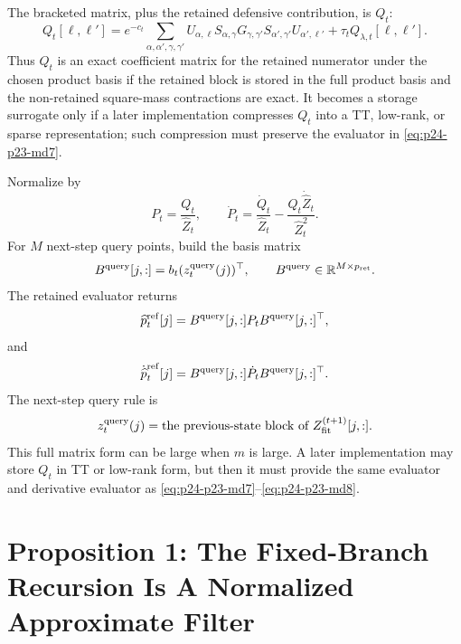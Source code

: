 \documentclass[11pt]{article}
\numberwithin{equation}{section}
\newcommand{\R}{\mathbb R}
\begin{document}
The bracketed matrix, plus the retained defensive contribution, is \(Q_t\):
\begin{equation}
    Q_t[\ell,\ell']
    =
    e^{-c_t}
    \sum_{\alpha,\alpha',\gamma,\gamma'}
    U_{\alpha,\ell}S_{\alpha,\gamma}
    G_{\gamma,\gamma'}
    S_{\alpha',\gamma'}U_{\alpha',\ell'}
    +
    \tau_t Q_{\lambda,t}[\ell,\ell'].
    \label{eq:p24-p23-md4e}
\end{equation}
Thus \(Q_t\) is an exact coefficient matrix for the retained numerator under
the chosen product basis if the retained block is stored in the full product
basis and the non-retained square-mass contractions are exact.  It becomes a
storage surrogate only if a later implementation compresses \(Q_t\) into a TT,
low-rank, or sparse representation; such compression must preserve the
evaluator in \eqref{eq:p24-p23-md7}.

Normalize by
\begin{equation}
    P_t=\frac{Q_t}{\widehat Z_t},
    \qquad
    \dot P_t=
    \frac{\dot Q_t}{\widehat Z_t}
    -
    \frac{Q_t\dot{\widehat Z}_t}{\widehat Z_t^2}.
    \label{eq:p24-p23-md5}
\end{equation}
For \(M\) next-step query points, build the basis matrix
\begin{equation}
    B^{\rm query}[j,:]=b_t(z_t^{\rm query}(j))^\top,
    \qquad
    B^{\rm query}\in\R^{M\times p_{\rm ret}}.
    \label{eq:p24-p23-md6}
\end{equation}
The retained evaluator returns
\begin{equation}
    \widehat p_t^{\rm ref}[j]
    =
    B^{\rm query}[j,:]P_tB^{\rm query}[j,:]^\top,
    \label{eq:p24-p23-md7}
\end{equation}
and
\begin{equation}
    \dot{\widehat p}_t^{\rm ref}[j]
    =
    B^{\rm query}[j,:]\dot P_tB^{\rm query}[j,:]^\top.
    \label{eq:p24-p23-md8}
\end{equation}
The next-step query rule is
\begin{equation}
    z_t^{\rm query}(j)
    =
    \text{the previous-state block of }Z_{\rm fit}^{(t+1)}[j,:].
    \label{eq:p24-p23-md9}
\end{equation}
This full matrix form can be large when \(m\) is large.  A later
implementation may store \(Q_t\) in TT or low-rank form, but then it must
provide the same evaluator and derivative evaluator as \eqref{eq:p24-p23-md7}--\eqref{eq:p24-p23-md8}.

\section{Proposition 1: The Fixed-Branch Recursion Is A Normalized Approximate Filter}
\end{document}
